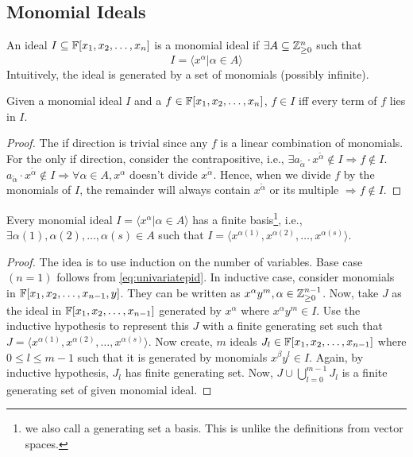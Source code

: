 \documentclass[a4paper,11pt]{article}
\begin{document}
\subsection{Monomial Ideals}
\begin{defn}
    An ideal $I\subseteq \mathbb{F}[x_1, x_2, \ldots, x_n]$ is a monomial ideal if $\exists A\subseteq \mathbb{Z}^n_{\geq0}$ such that
    \begin{equation}
        I = \langle x^\alpha | \alpha\in A\rangle
    \end{equation}
    Intuitively, the ideal is generated by a set of monomials (possibly infinite).
    \end{defn}
\begin{lem}{\label{eq:everytermlies}}
    Given a monomial ideal $I$ and a $f\in\mathbb{F}[x_1, x_2, \ldots, x_n]$, $f\in I$ iff every term of $f$ lies in $I$.
\end{lem}
\begin{proof}
    The if direction is trivial since any $f$ is a linear combination of monomials.\\
    For the only if direction, consider the contrapositive, i.e., $\exists a_{\tilde{\alpha}} \cdot x^{\tilde{\alpha}}\notin I\Rightarrow f\notin I$.\\
    $a_{\tilde{\alpha}} \cdot x^{\tilde{\alpha}}\notin I\Rightarrow \forall \alpha \in A, x^\alpha$ doesn't divide $x^{\tilde{\alpha}}$. Hence, when we divide $f$ by the monomials of $I$, the remainder will always contain $x^{\tilde{\alpha}}$ or its multiple $\Rightarrow f\notin I$.
\end{proof}
\begin{theorem}{\label{eq:dicksonlemma}}
    Every monomial ideal $I = \langle x^\alpha | \alpha\in A\rangle$ has a finite basis\footnote{we also call a generating set a basis. This is unlike the definitions from vector spaces.}, i.e., $\exists \alpha(1), \alpha(2), \ldots, \alpha(s)\in A$ such that $I = \langle x^{\alpha(1)}, x^{\alpha(2)}, \ldots, x^{\alpha(s)}\rangle$.
\end{theorem}
\begin{proof}
    The idea is to use induction on the number of variables. Base case $(n=1)$ follows from \ref{eq:univariatepid}. In inductive case, consider monomials in $\mathbb{F}[x_1, x_2, \ldots, x_{n-1}, y]$. They can be written as $x^\alpha y^m, \alpha\in \mathbb{Z}^{n-1}_{\geq0}$. Now, take $J$ as the ideal in $\mathbb{F}[x_1, x_2, \ldots, x_{n-1}]$ generated by $x^\alpha$ where $x^\alpha y^m\in I$. Use the inductive hypothesis to represent this $J$ with a finite generating set such that $J=\langle x^{\alpha(1)}, x^{\alpha(2)}, \ldots, x^{\alpha(s)}\rangle$. Now create, $m$ ideals $J_l\in\mathbb{F}[x_1, x_2, \ldots, x_{n-1}]$ where $0\leq l\leq m-1$ such that it is generated by monomials $x^\beta y^l\in I$. Again, by inductive hypothesis, $J_l$ has finite generating set. Now, $J\cup \bigcup_{l=0}^{m-1}J_l$ is a finite generating set of given monomial ideal.
\end{proof}
\end{document}
